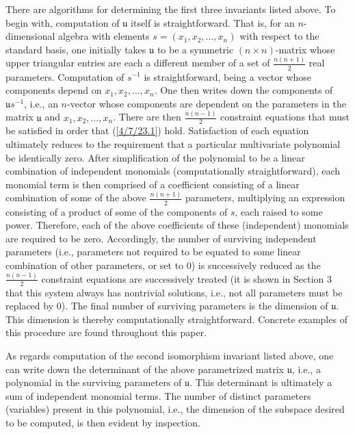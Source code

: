 \documentclass{amsart}
\numberwithin{equation}{section}
\theoremstyle{definition}
\numberwithin{theorem}{section}
\begin{document}
There are algorithms for determining the first three invariants listed above.  To begin with, computation of $\mathfrak{u}$ itself is straightforward.  That is, for an $n$-dimensional algebra with elements $s = (x_1,x_2,\dots,x_n)$ with respect to the standard basis, one initially takes $\mathfrak{u}$ to be a symmetric $(n\times n)$-matrix  whose upper triangular entries are each a different member of a set of $\frac{n(n+1)}{2}$ real parameters.  Computation of $s^{-1}$ is straightforward, being a vector whose components depend on $x_1,x_2,\dots,x_n$.  One then writes down the components of $\mathfrak{u}s^{-1}$, i.e., an $n$-vector whose components are dependent on the parameters in the matrix $\mathfrak{u}$ and $x_1,x_2,\dots,x_n$.  There are then $\frac{n(n-1)}{2}$ constraint equations that must be satisfied in order that (\ref{4/7/23.1}) hold.  Satisfaction of each equation ultimately reduces to the requirement that a particular multivariate polynomial be identically zero.  After simplification of the polynomial to be a linear combination of independent monomials (computationally straightforward), each monomial term is then comprised of a coefficient consisting of a linear combination of some of the above $\frac{n(n+1)}{2}$ parameters, multiplying an expression consisting of a product of some of the components of $s$, each raised to some power.  Therefore, each of the above coefficients of these (independent) monomials are required to be zero.  Accordingly, the number of surviving independent parameters (i.e., parameters not required to be equated to some linear combination of other parameters, or set to 0) is successively reduced as the $\frac{n(n-1)}{2}$ constraint equations are successively treated (it is shown in Section 3 that this system always has nontrivial solutions, i.e., not all parameters must be replaced by 0).   The final number of surviving parameters is the dimension of $\mathfrak{u}$.  This dimension is thereby computationally straightforward. Concrete examples of this procedure are found throughout this paper.

As regards computation of the second isomorphism invariant listed above, one can write down the determinant of the above parametrized matrix $\mathfrak{u}$, i.e., a polynomial in the surviving parameters of $\mathfrak{u}$.  This determinant is ultimately a sum of independent monomial terms.  The number of distinct parameters (variables) present in this polynomial, i.e., the dimension of the subspace desired to be computed, is then evident by inspection.
\end{document}
